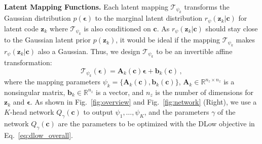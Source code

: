 \documentclass[runningheads]{llncs}
\begin{document}
	\vspace{2mm}
	\noindent\textbf{Latent Mapping Functions.}
	Each latent mapping $\mathcal{T}_{\psi_k}$ transforms the Gaussian distribution $p(\boldsymbol{\epsilon})$ to the marginal latent distribution $r_\psi(\mathbf{z}_k|\mathbf{c})$ for latent code $\mathbf{z}_k$ where $\mathcal{T}_{\psi_k}$ is also conditioned on $\mathbf{c}$. As $r_\psi(\mathbf{z}_k|\mathbf{c})$ should stay close to the Gaussian latent prior $p(\mathbf{z}_k)$, it would be ideal if the mapping $\mathcal{T}_{\psi_k}$ makes $r_\psi(\mathbf{z}_k|\mathbf{c})$ also a Gaussian. Thus, we design $\mathcal{T}_{\psi_k}$ to be an invertible affine transformation:
	\begin{equation}
	\label{eq:mapping}
	\mathcal{T}_{\psi_k}(\boldsymbol{\epsilon}) = \mathbf{A}_k(\mathbf{c})\boldsymbol{\epsilon} + \mathbf{b}_k(\mathbf{c}) \,,
	\end{equation}
	where the mapping parameters $\psi_k = \{\mathbf{A}_k(\mathbf{c}), \mathbf{b}_k(\mathbf{c})\}$, $\mathbf{A}_k \in \mathbb{R}^{n_z \times n_z}$ is a nonsingular matrix, $\mathbf{b}_k \in \mathbb{R}^{n_z}$ is a vector, and $n_z$ is the number of dimensions for $\mathbf{z}_k$ and $\boldsymbol{\epsilon}$. As shown in Fig.~\ref{fig:overview} and Fig.~\ref{fig:network} (Right), we use a $K$-head network $Q_\gamma(\mathbf{c})$ to output $\psi_1, \ldots, \psi_K$, and the parameters $\gamma$ of the network $Q_\gamma(\mathbf{c})$ are the parameters to be optimized with the DLow objective in Eq.~\eqref{eq:dlow_overall}.
	
\end{document}
